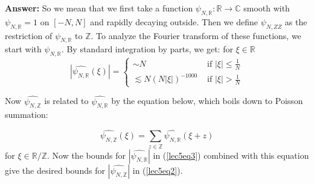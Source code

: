 \documentclass[12pt]{amsart}
\newcommand{\CC}{\mathbb{C}}
\newcommand{\ZZ}{\mathbb{Z}}
\newcommand{\RR}{\mathbb{R}}
\begin{document}
\textbf{Answer:} So we mean that we first take a function $\psi_{N, \RR} : \RR \to \CC$ smooth with $\psi_{N, \RR} = 1$ on $[-N, N]$ and rapidly decaying outside.   Then we define $\psi_{N, ZZ}$ as the restriction of $\psi_{N, \RR}$ to $\ZZ$.  To analyze the Fourier transform of these functions,  we start with $\psi_{N, \RR}$.   By standard integration by parts,  we get: for $\xi \in \RR$
\begin{equation}
    |\widehat{\psi_{N, \RR}} (\xi)| =
    \begin{cases}
        \sim N &\text{ if } |\xi| \leq \frac{1}{N} \\
        \lesssim N(N|\xi|)^{-1000} &\text{ if } |\xi| > \frac{1}{N}
    \end{cases}
    \label{lec5eq3}
\end{equation}


Now $\widehat{ \psi_{N, \ZZ}} $ is related to $\widehat{\psi_{N, \RR}}$ by the equation below,  which boils down to Poisson summation:

\begin{equation*}
    \widehat{\psi_{N, \ZZ}} (\xi) = \sum_{z \in \ZZ} \widehat{\psi_{N, \RR}} (\xi + z)
\end{equation*}
for $\xi \in \RR / \ZZ$.   Now the bounds for $|\widehat{\psi_{N, \RR}}|$ in (\ref{lec5eq3}) combined with this equation give the desired bounds for $|\widehat{\psi_{N, \ZZ}}|$ in (\ref{lec5eq2}).  \\
\end{document}

